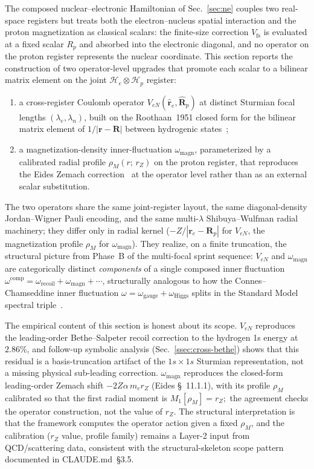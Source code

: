 \documentclass[twocolumn,prc,amsmath,amssymb,superscriptaddress]{revtex4-2}
\begin{document}
The composed nuclear--electronic Hamiltonian of Sec.~\ref{sec:ne} couples
two real-space registers but treats both the electron--nucleus spatial
interaction and the proton magnetization as classical scalars: the
finite-size correction $V_{\mathrm{fs}}$ is evaluated at a fixed scalar
$R_p$ and absorbed into the electronic diagonal, and no operator on the
proton register represents the nuclear coordinate. This section
reports the construction of two operator-level upgrades that promote
each scalar to a bilinear matrix element on the joint
$\mathcal{H}_e \otimes \mathcal{H}_p$ register:
\begin{enumerate}
  \item a cross-register Coulomb operator
    $V_{eN}(\hat{\mathbf{r}}_e, \hat{\mathbf{R}}_p)$ at distinct
    Sturmian focal lengths $(\lambda_e, \lambda_n)$, built on the
    Roothaan~1951 closed form for the bilinear matrix element of
    $1/|\mathbf{r} - \mathbf{R}|$ between hydrogenic
    states~\cite{Roothaan1951};
  \item a magnetization-density inner-fluctuation
    $\omega_{\mathrm{magn}}$, parameterized by a calibrated radial
    profile $\rho_M(r;\,r_Z)$ on the proton register, that reproduces
    the Eides Zemach correction~\cite{EidesGrotchShelyuto2007}
    at the operator level rather than as an external scalar substitution.
\end{enumerate}
The two operators share the same joint-register layout, the same
diagonal-density Jordan--Wigner Pauli encoding, and the same multi-$\lambda$
Shibuya--Wulfman radial machinery; they differ only in radial kernel
($-Z/|\mathbf{r}_e - \mathbf{R}_p|$ for $V_{eN}$, the magnetization
profile $\rho_M$ for $\omega_{\mathrm{magn}}$). They realize, on a finite
truncation, the structural picture from Phase~B of the multi-focal
sprint sequence: $V_{eN}$ and $\omega_{\mathrm{magn}}$ are categorically
distinct \emph{components} of a single composed inner fluctuation
$\omega^{\mathrm{comp}} = \omega_{\mathrm{recoil}} + \omega_{\mathrm{magn}}
+ \cdots$, structurally analogous to how the Connes--Chamseddine inner
fluctuation $\omega = \omega_{\mathrm{gauge}} + \omega_{\mathrm{Higgs}}$
splits in the Standard Model spectral
triple~\cite{ChamseddineConnes2010,Paper32}.

The empirical content of this section is honest about its scope.
$V_{eN}$ reproduces the leading-order Bethe--Salpeter recoil correction
to the hydrogen 1s energy at $2.86\%$, and follow-up symbolic analysis
(Sec.~\ref{ssec:cross-bethe}) shows that this residual is a
basis-truncation artifact of the $1s \times 1s$ Sturmian representation,
not a missing physical sub-leading correction. $\omega_{\mathrm{magn}}$
reproduces the closed-form leading-order Zemach shift
$-2Z\alpha\, m_e r_Z$ (Eides \S~11.1.1), with its profile $\rho_M$ calibrated so that the
first radial moment is $M_1[\rho_M] = r_Z$;\ the agreement checks the
operator construction, not the value of $r_Z$. The structural interpretation is that the
framework computes the operator action given a fixed $\rho_M$, and the
calibration ($r_Z$ value, profile family) remains a Layer-2 input from
QCD/scattering data, consistent with the structural-skeleton scope
pattern documented in CLAUDE.md~\S3.5.
\end{document}
